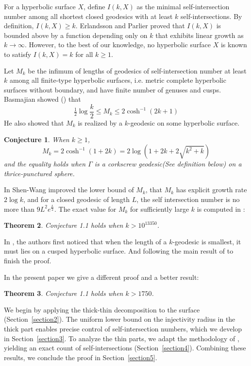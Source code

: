 \documentclass[11pt, a4paper]{article}
\newtheorem{thm}{Theorem}[section]
\newtheorem{conj}[thm]{Conjecture}
\theoremstyle{definition}
\theoremstyle{remark}
\begin{document}
For a hyperbolic surface $X$, define $I(k,X)$ as the minimal self-intersection number among all shortest closed geodesics with at least $k$ self-intersections. By definition, $I(k,X) \geq k$. Erlandsson and Parlier \cite{EP2802} proved that $I(k,X)$ is bounded above by a function depending only on $k$ that exhibits linear growth as $k \to \infty$. However, to the best of our knowledge, no hyperbolic surface $X$ is known to satisfy $I(k,X) = k$ for all $k \geqslant 1$.

Let $M_k$ be the infimum of lengths of geodesics of self-intersection number at least $k$ among all finite-type hyperbolic surfaces, i.e. metric complete hyperbolic surfaces without boundary, and have finite number of genuses and cusps. Basmajian showed (\cite[Corollary 1.4]{B2803}) that
\begin{equation}\label{eqn:growth_bas}
\tfrac12\log \frac{k}2\leqslant M_k \leqslant 2\cosh^{-1}(2k+1)
\end{equation}
He also showed that $M_k$ is realized by a $k$-geodesic on some hyperbolic surface. 

\begin{conj}
When $k\geqslant1$,
\begin{equation}\label{eqn:length_asymptotic}
M_k=2\cosh^{-1}(1+2k)=2\log(1+2k+2\sqrt{k^2+k})
\end{equation}
and the equality holds when $\Gamma$ is a corkscrew geodesic(See definition below) on a thrice-punctured sphere.
\end{conj}

In \cite[Theorem 1.1]{Y2800} Shen-Wang improved the lower bound of $M_k$, that $M_k$ has explicit growth rate $2\log{k}$, and for a closed geodesic of length $L$, the self intersection number is no more than $9L^2e^{\frac{L}{2}}$. The exact value for $M_k$ for sufficiently large $k$ is computed in \cite[Theorem 1.1]{Y2801}:


\begin{thm}\label{thm:main00}
 Conjecture 1.1 holds when $k>10^{13350}$. 
\end{thm}

In \cite{Y2801}, the authors first noticed that when the length of a $k$-geodesic is smallest, it must lies on a cusped hyperbolic surface. And following the main result of \cite{Y2805} to finish the proof.

In the present paper we give a different proof and a better result: 
\begin{thm}\label{thm:main}
 Conjecture 1.1 holds when $k>1750$. 
\end{thm}
We begin by applying the thick-thin decomposition to the surface (Section~\ref{section2}). The uniform lower bound on the injectivity radius in the thick part enables precise control of self-intersection numbers, which we develop in Section~\ref{section3}. To analyze the thin parts, we adapt the methodology of \cite[Lemma 2.5]{Y2805}, yielding an exact count of self-intersections (Section~\ref{section4}). Combining these results, we conclude the proof in Section~\ref{section5}.
\end{document}
